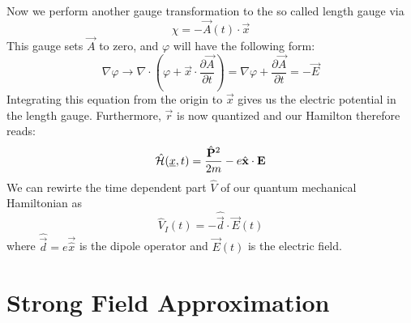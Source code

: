 Now we perform another gauge transformation to the so called length gauge via 
\begin{equation*}
    \chi = -\vec{A}(t)\cdot \vec{x} %
\end{equation*}
This gauge sets $\vec{A}$ to zero, and $\varphi$ will have the following form:
\begin{equation*}
    \nabla \varphi \to \nabla \cdot (\varphi + \vec{x} \cdot \frac{\partial \vec{A}}{\partial t}) = \nabla \varphi + \frac{\partial \vec{A}}{\partial t} = - \vec{E}
\end{equation*}
Integrating this equation from the origin to $\vec{x}$ gives us the electric potential in the length gauge. Furthermore, $\vec{r}$ is now quantized and our Hamilton therefore reads:
\begin{equation*}
    \hat{\Hs}(\uvec{x}, t) = \frac{\hat{\vec{P}}^2}{2m} - e \hat{\vec{x}} \cdot \vec{E} %
\end{equation*}
We can rewirte the time dependent part $\hat{V}$ of our quantum mechanical Hamiltonian as
\begin{equation}
    \hat{V}_I(t) = -\hat{\vec{d}} \cdot \vec{E}(t) \label{eq:dipoleApprox}
\end{equation}
where $\hat{\vec{d}}=e\vec{\hat{x}}$ is the dipole operator and $\vec{E}(t)$ is the electric field.







\newpage
\section{Strong Field Approximation}

